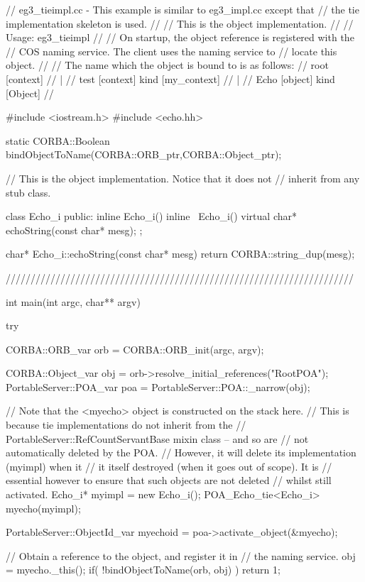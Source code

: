 \documentclass[11pt,twoside,a4paper]{book}
\begin{document}
\begin{cxxlisting}
// eg3_tieimpl.cc - This example is similar to eg3_impl.cc except that
//                  the tie implementation skeleton is used.
//
//               This is the object implementation.
//
// Usage: eg3_tieimpl
//
//        On startup, the object reference is registered with the 
//        COS naming service. The client uses the naming service to
//        locate this object.
//
//        The name which the object is bound to is as follows:
//              root  [context]
//               |
//              test  [context] kind [my_context]
//               |
//              Echo  [object]  kind [Object]
//

#include <iostream.h>
#include <echo.hh>


static CORBA::Boolean bindObjectToName(CORBA::ORB_ptr,CORBA::Object_ptr);


// This is the object implementation.  Notice that it does not
// inherit from any stub class.

class Echo_i {
public:
  inline Echo_i() {}
  inline ~Echo_i() {}
  virtual char* echoString(const char* mesg);
};


char* Echo_i::echoString(const char* mesg)
{
  return CORBA::string_dup(mesg);
}

//////////////////////////////////////////////////////////////////////

int main(int argc, char** argv)
{
  try {
    CORBA::ORB_var orb = CORBA::ORB_init(argc, argv);

    CORBA::Object_var obj = orb->resolve_initial_references("RootPOA");
    PortableServer::POA_var poa = PortableServer::POA::_narrow(obj);

    // Note that the <myecho> object is constructed on the stack here.
    // This is because tie implementations do not inherit from the
    // PortableServer::RefCountServantBase mixin class -- and so are
    // not automatically deleted by the POA.
    // However, it will delete its implementation (myimpl) when it
    // it itself destroyed (when it goes out of scope).  It is
    // essential however to ensure that such objects are not deleted
    // whilst still activated.
    Echo_i* myimpl = new Echo_i();
    POA_Echo_tie<Echo_i> myecho(myimpl);

    PortableServer::ObjectId_var myechoid = poa->activate_object(&myecho);

    // Obtain a reference to the object, and register it in
    // the naming service.
    obj = myecho._this();
    if( !bindObjectToName(orb, obj) )
      return 1;

}}
\end{cxxlisting}
\end{document}
